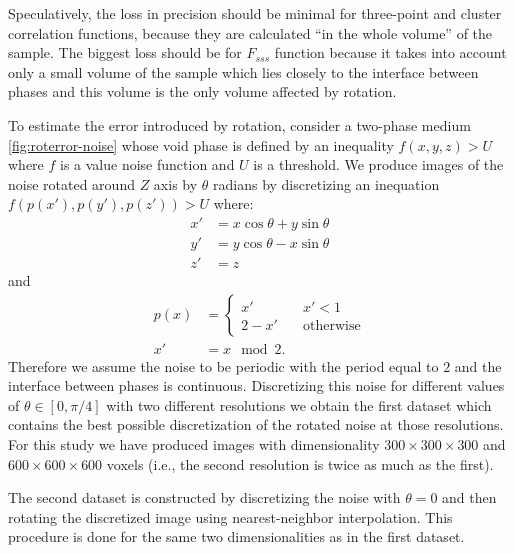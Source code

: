 \documentclass[reprint,amsmath,amssymb,aps,pre,showkeys,showpacs]{revtex4-1}
\begin{document}
Speculatively, the loss in precision should be minimal for three-point and
cluster correlation functions, because they are calculated
``in the whole volume'' of the sample. The biggest loss should be for $F_{sss}$
function because it takes into account only a small volume of the sample which
lies closely to the interface between phases and this volume is the only volume
affected by rotation.

To estimate the error introduced by rotation, consider a two-phase medium
\cref{fig:roterror-noise} whose void phase is defined by an inequality
$f(x, y, z) > U$ where $f$ is a value noise function
\cite[Section IV.B]{samarin2023robust} and $U$ is a threshold. We produce images
of the noise rotated around $Z$ axis by $\theta$ radians by discretizing an
inequation $f(p(x'), p(y'), p(z')) > U$ where:
\begin{equation*}
  \begin{aligned}
    x' &= x \cos \theta + y \sin \theta \\
    y' &= y \cos \theta - x \sin \theta \\
    z' &= z
  \end{aligned}
\end{equation*}
and
\begin{equation*}
  \begin{aligned}
    p(x) &= \left\{
    \begin{array}{ll}
      x'     & \quad x' < 1 \\
      2 - x' & \quad \text{otherwise}
    \end{array}
    \right. \\
    x ' &= x \mod 2.
  \end{aligned}
\end{equation*}
Therefore we assume the noise to be periodic with the period equal to $2$ and
the interface between phases is continuous. Discretizing this noise for
different values of $\theta \in [0, \pi/4]$ with two different resolutions we
obtain the first dataset which contains the best possible discretization of the
rotated noise at those resolutions. For this study we have produced images with
dimensionality $300 \times 300 \times 300$ and $600 \times 600 \times 600$
voxels (i.e., the second resolution is twice as much as the first).

The second dataset is constructed by discretizing the noise with $\theta = 0$ and
then rotating the discretized image using nearest-neighbor interpolation. This
procedure is done for the same two dimensionalities as in the first dataset.
\end{document}
